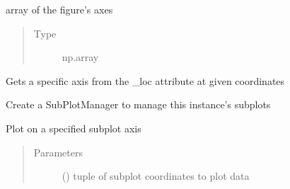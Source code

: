 \documentclass[letterpaper,10pt,english]{sphinxmanual}
\begin{document}
\begin{fulllineitems}

\begin{fulllineitems}
\label{\detokenize{dalio.external:dalio.external.PySubplotGraph._loc}}
array of the figure’s axes
\begin{quote}\begin{description}
\item[{Type}] \leavevmode
np.array

\end{description}\end{quote}

\end{fulllineitems}


\begin{fulllineitems}
\label{\detokenize{dalio.external:dalio.external.PySubplotGraph.get_loc}}
Gets a specific axis from the \_loc attribute at given
coordinates

\end{fulllineitems}


\begin{fulllineitems}
\label{\detokenize{dalio.external:dalio.external.PySubplotGraph.make_manager}}
Create a SubPlotManager to manage this instance’s subplots

\end{fulllineitems}


\begin{fulllineitems}
\label{\detokenize{dalio.external:dalio.external.PySubplotGraph.plot}}
Plot on a specified subplot axis
\begin{quote}\begin{description}
\item[{Parameters}] \leavevmode
{} () \textendash{} tuple of subplot coordinates to plot data


\end{description}
\end{quote}
\end{fulllineitems}
\end{fulllineitems}
\end{document}

